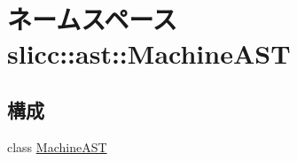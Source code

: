 \hypertarget{namespaceslicc_1_1ast_1_1MachineAST}{
\section{ネームスペース slicc::ast::MachineAST}
\label{namespaceslicc_1_1ast_1_1MachineAST}
}
\subsection*{構成}
\begin{DoxyCompactItemize}
\item 
class \hyperlink{classslicc_1_1ast_1_1MachineAST_1_1MachineAST}{MachineAST}
\end{DoxyCompactItemize}
